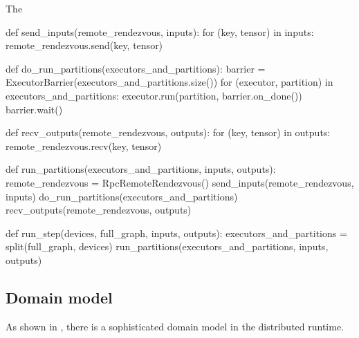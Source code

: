 \begin{content}
The %


\begin{leftbar}
\begin{python}
def send_inputs(remote_rendezvous, inputs):
  for (key, tensor) in inputs:
    remote_rendezvous.send(key, tensor)

def do_run_partitions(executors_and_partitions):
  barrier = ExecutorBarrier(executors_and_partitions.size())
  for (executor, partition) in executors_and_partitions:
    executor.run(partition, barrier.on_done())  
  barrier.wait()

def recv_outputs(remote_rendezvous, outputs):
  for (key, tensor) in outputs:
    remote_rendezvous.recv(key, tensor)

def run_partitions(executors_and_partitions, inputs, outputs):
  remote_rendezvous = RpcRemoteRendezvous()
  send_inputs(remote_rendezvous, inputs)
  do_run_partitions(executors_and_partitions)
  recv_outputs(remote_rendezvous, outputs)

def run_step(devices, full_graph, inputs, outputs):
  executors_and_partitions = split(full_graph, devices)
  run_partitions(executors_and_partitions, inputs, outputs)
\end{python}
\end{leftbar}


\subsection{Domain model}
As shown in , there is a sophisticated domain model in the \tf{} distributed runtime.


\end{content}
